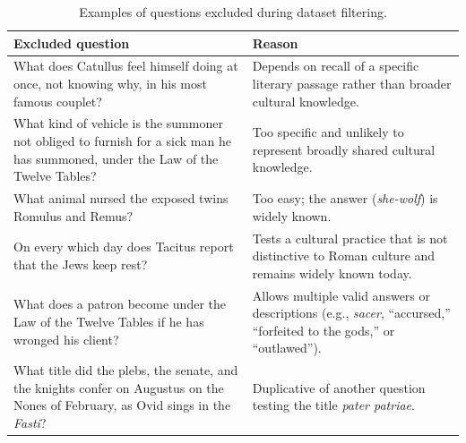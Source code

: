 \begin{table}[t]
\centering
\setlength{\tabcolsep}{5pt}
\begin{tabularx}{\linewidth}{@{}X X@{}}
\toprule
\textbf{Excluded question} & \textbf{Reason} \\
\midrule
What does Catullus feel himself doing at once, not knowing why, in his most famous couplet? & Depends on recall of a specific literary passage rather than broader cultural knowledge. \\ \hline
\addlinespace
What kind of vehicle is the summoner not obliged to furnish for a sick man he has summoned, under the Law of the Twelve Tables? & Too specific and unlikely to represent broadly shared cultural knowledge. \\\hline
\addlinespace
What animal nursed the exposed twins Romulus and Remus? & Too easy; the answer (\textit{she-wolf}) is widely known. \\\hline
\addlinespace
On every which day does Tacitus report that the Jews keep rest? & Tests a cultural practice that is not distinctive to Roman culture and remains widely known today. \\\hline
\addlinespace
What does a patron become under the Law of the Twelve Tables if he has wronged his client? & Allows multiple valid answers or descriptions (e.g., \textit{sacer}, ``accursed,'' ``forfeited to the gods,'' or ``outlawed''). \\\hline
\addlinespace
What title did the plebs, the senate, and the knights confer on Augustus on the Nones of February, as Ovid sings in the \textit{Fasti}? & Duplicative of another question testing the title \textit{pater patriae}. \\
\bottomrule
\end{tabularx}
\caption{Examples of questions excluded during dataset filtering.}
\label{tab:exclusion-examples}
\end{table}